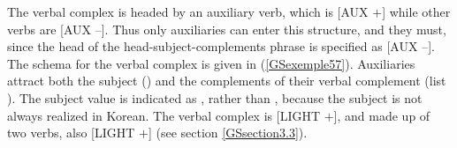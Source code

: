 \documentclass[output=paper
	        ,collection
	        ,collectionchapter
 	        ,biblatex
                ,babelshorthands
                ,newtxmath
                ,draftmode
                ,colorlinks, citecolor=brown
]{langscibook}
\begin{document}
{The verbal complex is headed by an auxiliary verb, which is [AUX $+$] while other verbs are [AUX $–$].  Thus only auxiliaries can enter this structure, and they must, since the head of the head-subject-complements phrase is specified as [AUX $–$]. The schema for the verbal complex is given in (\ref{GSexemple57}). Auxiliaries attract both the subject () and the complements of their verbal complement (list ). The subject value is indicated as , rather than \la{}\ra, because the subject is not always realized in Korean. The verbal complex is [LIGHT $+$], and made up of two verbs, also [LIGHT $+$] (see section \ref{GSsection3.3}). 


\newpage
\begin{exe}
    \label{GSexemple57}
\end{exe}


}
\end{document}
